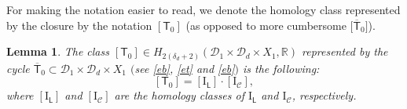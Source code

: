 \documentclass[11pt]{article}
\numberwithin{equation}{section}
\newtheorem{lmm}[thm]{Lemma}
\begin{document}
For making the notation easier to read, we denote the homology class
represented by the closure by the notation $[\mathsf{T}_0]$
\big(as opposed to more cumbersome $\big[\overline{\mathsf{T}}_0\big]$\big).

\begin{lmm}\label{Theo_tzr}
The class $[\mathsf{T}_0] \in H_{2(\delta_d +2)}(\mathcal{D}_1 \times \mathcal{D}_d \times X_1, {\mathbb R})$
represented by the cycle $\overline{\mathsf{T}}_0 \subset \mathcal{D}_1 \times \mathcal{D}_d \times X_1$
$($see \eqref{eb}, \eqref{et} and \eqref{eb}$)$ is the following:
\begin{equation}\label{T0_cycle_expression_base}
[\mathsf{T}_0]  =  [\mathrm{I}_{\mathsf{L}}] \cdot [\mathrm{I}_{\mathcal{C}}],
\end{equation}
where $[\mathrm{I}_{\mathsf{L}}]$ and $[\mathrm{I}_{\mathcal{C}}]$ are the homology classes of
$\mathrm{I}_{\mathsf{L}}$ and $\mathrm{I}_{\mathcal{C}}$, respectively.
\end{lmm}
\end{document}
